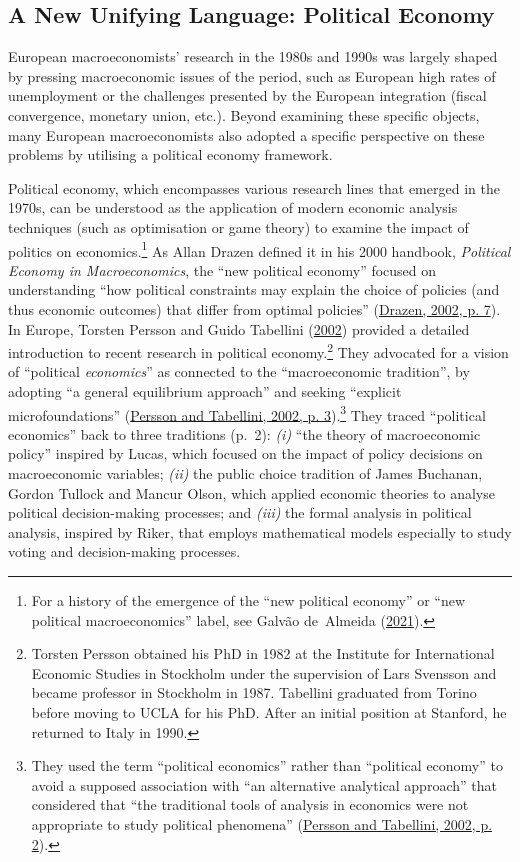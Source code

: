 \documentclass[
  12pt,
  onecolumn]{article}
\begin{document}
\hypertarget{political-economics}{%
\subsection{A New Unifying Language: Political Economy}\label{political-economics}}

European macroeconomists' research in the 1980s and 1990s was largely shaped by pressing macroeconomic issues of the period, such as European high rates of unemployment or the challenges presented by the European integration (fiscal convergence, monetary union, etc.). Beyond examining these specific objects, many European macroeconomists also adopted a specific perspective on these problems by utilising a political economy framework.

Political economy, which encompasses various research lines that emerged in the 1970s, can be understood as the application of modern economic analysis techniques (such as optimisation or game theory) to examine the impact of politics on economics.\footnote{For a history of the emergence of the ``new political economy'' or ``new political macroeconomics'' label, see Galvão de~Almeida (\protect\hyperlink{ref-galvaodealmeida2021}{2021}).} As Allan Drazen defined it in his 2000 handbook, \emph{Political Economy in Macroeconomics}, the ``new political economy'' focused on understanding ``how political constraints may explain the choice of policies (and thus economic outcomes) that differ from optimal policies'' (\protect\hyperlink{ref-drazen2002}{Drazen, 2002, p. 7}). In Europe, Torsten Persson and Guido Tabellini (\protect\hyperlink{ref-persson2002}{2002}) provided a detailed introduction to recent research in political economy.\footnote{Torsten Persson obtained his PhD in 1982 at the Institute for International Economic Studies in Stockholm under the supervision of Lars Svensson and became professor in Stockholm in 1987. Tabellini graduated from Torino before moving to UCLA for his PhD. After an initial position at Stanford, he returned to Italy in 1990.} They advocated for a vision of ``political \emph{economics}'' as connected to the ``macroeconomic tradition'', by adopting ``a general equilibrium approach'' and seeking ``explicit microfoundations'' (\protect\hyperlink{ref-persson2002}{Persson and Tabellini, 2002, p. 3}).\footnote{They used the term ``political economics'' rather than ``political economy'' to avoid a supposed association with ``an alternative analytical approach'' that considered that ``the traditional tools of analysis in economics were not appropriate to study political phenomena'' (\protect\hyperlink{ref-persson2002}{Persson and Tabellini, 2002, p. 2}).} They traced ``political economics'' back to three traditions (p.~2): \emph{(i)} ``the theory of macroeconomic policy'' inspired by Lucas, which focused on the impact of policy decisions on macroeconomic variables; \emph{(ii)} the public choice tradition of James Buchanan, Gordon Tullock and Mancur Olson, which applied economic theories to analyse political decision-making processes; and \emph{(iii)} the formal analysis in political analysis, inspired by Riker, that employs mathematical models especially to study voting and decision-making processes.
\end{document}
